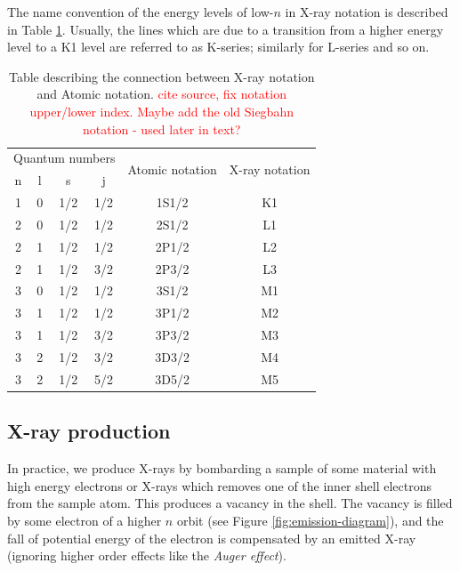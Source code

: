 \documentclass[11pt,a4paper,twoside,onecolumn]{article}
\newcommand{\reminder}[1]{\textcolor{red}{#1}}
\begin{document}
The name convention of the energy levels of low-$n$ in X-ray notation is described in Table \ref{tab:x-ray-notation}. Usually, the lines which are due to a transition from a higher energy level to a K1 level are referred to as K-series; similarly for L-series and so on.
\begin{table}[!htbp]
    \centering
    \begin{tabular}{@{}cccccc@{}}
    \toprule
    \multicolumn{4}{l}{Quantum numbers} & \multirow{2}{*}{Atomic notation} & \multirow{2}{*}{X-ray notation} \\ \cmidrule(r){1-4}
    n      & l      & s       & j       &                                  &                                 \\ \midrule
    1      & 0      & 1/2     & 1/2     & 1S1/2                            & K1                              \\
    2      & 0      & 1/2     & 1/2     & 2S1/2                            & L1                              \\
    2      & 1      & 1/2     & 1/2     & 2P1/2                            & L2                              \\
    2      & 1      & 1/2     & 3/2     & 2P3/2                            & L3                              \\
    3      & 0      & 1/2     & 1/2     & 3S1/2                            & M1                              \\
    3      & 1      & 1/2     & 1/2     & 3P1/2                            & M2                              \\
    3      & 1      & 1/2     & 3/2     & 3P3/2                            & M3                              \\
    3      & 2      & 1/2     & 3/2     & 3D3/2                            & M4                              \\
    3      & 2      & 1/2     & 5/2     & 3D5/2                            & M5                              \\ \bottomrule
    \end{tabular}
    \caption{Table describing the connection between X-ray notation and Atomic notation. \reminder{cite source, fix notation upper/lower index. Maybe add the old Siegbahn notation - used later in text?}}
    \label{tab:x-ray-notation}
\end{table}

\subsection{X-ray production}\label{subsec:x-ray-production}
In practice, we produce X-rays by bombarding a sample of some material with high energy electrons or X-rays which removes one of the inner shell electrons from the sample atom. This produces a vacancy in the shell. The vacancy is filled by some electron of a higher $n$ orbit (see Figure \ref{fig:emission-diagram}), and the fall of potential energy of the electron is compensated by an emitted X-ray (ignoring higher order effects like the \emph{Auger effect}).
\end{document}
